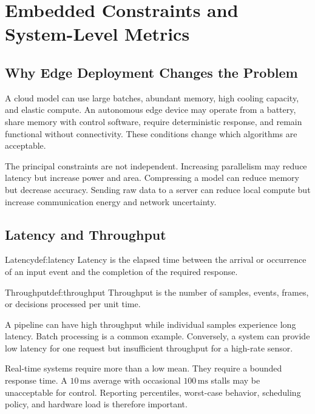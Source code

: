 \chapter{Embedded Constraints and System-Level Metrics}
\label{chap:embedded-constraints}

\section{Why Edge Deployment Changes the Problem}

A cloud model can use large batches, abundant memory, high cooling capacity, and elastic compute. An autonomous edge device may operate from a battery, share memory with control software, require deterministic response, and remain functional without connectivity. These conditions change which algorithms are acceptable.

The principal constraints are not independent. Increasing parallelism may reduce latency but increase power and area. Compressing a model can reduce memory but decrease accuracy. Sending raw data to a server can reduce local compute but increase communication energy and network uncertainty.

\section{Latency and Throughput}

\begin{definition}{Latency}{def:latency}
Latency is the elapsed time between the arrival or occurrence of an input event and the completion of the required response.
\end{definition}

\begin{definition}{Throughput}{def:throughput}
Throughput is the number of samples, events, frames, or decisions processed per unit time.
\end{definition}

A pipeline can have high throughput while individual samples experience long latency. Batch processing is a common example. Conversely, a system can provide low latency for one request but insufficient throughput for a high-rate sensor.

Real-time systems require more than a low mean. They require a bounded response time. A \(10\,\mathrm{ms}\) average with occasional \(100\,\mathrm{ms}\) stalls may be unacceptable for control. Reporting percentiles, worst-case behavior, scheduling policy, and hardware load is therefore important.

